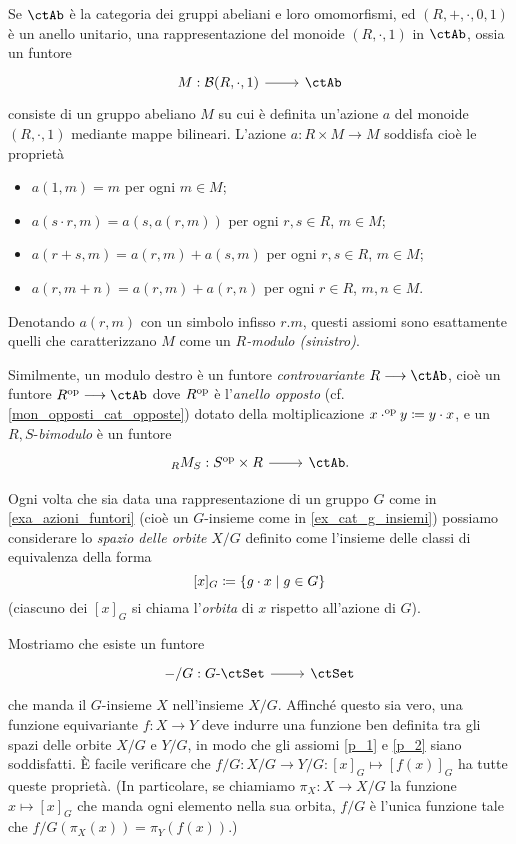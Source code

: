 \begin{example}
	Se \(\ctAb\) è la categoria dei gruppi abeliani e loro omomorfismi, ed \((R,+,\cdot,0,1)\) è un anello unitario, una rappresentazione del monoide \((R,\cdot,1)\) in \(\ctAb\), ossia un funtore
	\[\dmFun{M}{\susp(R,\cdot,1)}{\ctAb}\]
	consiste di un gruppo abeliano \(M\) su cui è definita un'azione \(a\) del monoide \((R,\cdot,1)\) mediante mappe bilineari. L'azione \(a : R\times M\to M\) soddisfa cioè le proprietà
	\begin{itemize}
		\item \(a(1,m)=m\) per ogni \(m\in M\);
		\item \(a(s\cdot r,m)=a(s,a(r,m))\) per ogni \(r,s\in R\), \(m\in M\);
		\item \(a(r+s,m) = a(r,m) + a(s,m)\) per ogni \(r,s\in R\), \(m\in M\);
		\item \(a(r,m+n) = a(r,m) + a(r,n)\) per ogni \(r\in R\), \(m,n\in M\).
	\end{itemize}
	Denotando \(a(r,m)\) con un simbolo infisso \(r.m\), questi assiomi sono esattamente quelli che caratterizzano \(M\) come un \emph{\(R\)-modulo (sinistro)}.

	Similmente, un modulo destro è un funtore \emph{controvariante} \(R\fun\ctAb\), cioè un funtore \(R^\op\fun\ctAb\) dove \(R^{\text{op}}\) è l'\emph{anello opposto} (cf. \ref{mon_opposti_cat_opposte}) dotato della moltiplicazione \(x\cdot^{\text{op}} y \coloneqq y\cdot x\), e un \(R,S\)-\emph{bimodulo} è un funtore
	\[\dmFun{{}_RM_S}{S^\op\times R}{\ctAb.}\]
\end{example}
\begin{example}\label{ex_fun_orbite}
	Ogni volta che sia data una rappresentazione di un gruppo \(G\) come in \ref{exa_azioni_funtori} (cioè un \(G\)-insieme come in \ref{ex_cat_g_insiemi}) possiamo considerare lo \emph{spazio delle orbite} \(X/G\) definito come l'insieme delle classi di equivalenza della forma
	\[[x]_G \coloneqq \{g\cdot x\mid g\in G\}\]
	(ciascuno dei \([x]_G\) si chiama l'\emph{orbita} di \(x\) rispetto all'azione di \(G\)).

	Mostriamo che esiste un funtore
	\[\dmFun{-/G}{G\emdash\ctSet}{\ctSet}\]
	che manda il \(G\)-insieme \(X\) nell'insieme \(X/G\). Affinché questo sia vero, una funzione equivariante \(f : X\to Y\) deve indurre una funzione ben definita tra gli spazi delle orbite \(X/G\) e \(Y/G\), in modo che gli assiomi \ref{p_1} e \ref{p_2} siano soddisfatti. \`E facile verificare che \(f/G : X/G \to Y/G : [x]_G\mapsto [f(x)]_G\) ha tutte queste proprietà. (In particolare, se chiamiamo \(\pi_X : X\to X/G\) la funzione \(x\mapsto [x]_G\) che manda ogni elemento nella sua orbita, \(f/G\) è l'unica funzione tale che \(f/G(\pi_X(x)) = \pi_Y(f(x))\).)
\end{example}
